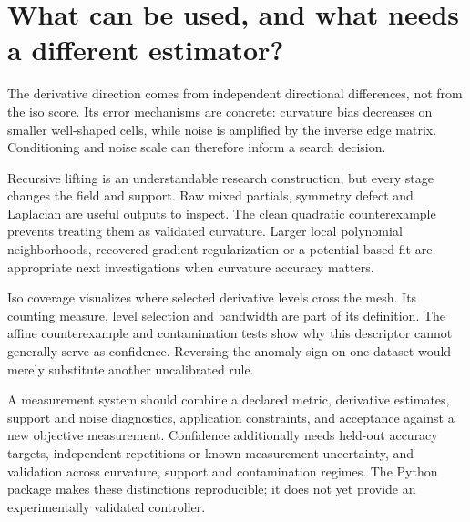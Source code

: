 \section{What can be used, and what needs a different estimator?}
The derivative direction comes from independent directional differences,
not from the iso score. Its error mechanisms are concrete: curvature bias
decreases on smaller well-shaped cells, while noise is amplified by the
inverse edge matrix. Conditioning and noise scale can therefore inform a
search decision.

Recursive lifting is an understandable research construction, but every
stage changes the field and support. Raw mixed partials, symmetry defect
and Laplacian are useful outputs to inspect. The clean quadratic counterexample
prevents treating them as validated curvature. Larger local polynomial
neighborhoods, recovered gradient regularization or a potential-based fit
are appropriate next investigations when curvature accuracy matters.

Iso coverage visualizes where selected derivative levels cross the mesh.
Its counting measure, level selection and bandwidth are part of its
definition. The affine counterexample and contamination tests show why
this descriptor cannot generally serve as confidence. Reversing the anomaly
sign on one dataset would merely substitute another uncalibrated rule.

A measurement system should combine a declared metric, derivative estimates,
support and noise diagnostics, application constraints, and acceptance
against a new objective measurement. Confidence additionally needs held-out
accuracy targets, independent repetitions or known measurement uncertainty,
and validation across curvature, support and contamination regimes.
The Python package makes these distinctions reproducible; it does not yet
provide an experimentally validated controller.
